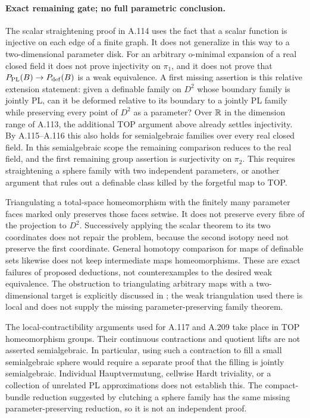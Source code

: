 \paragraph{Exact remaining gate; no full parametric conclusion.}
The scalar straightening proof in A.114 uses the fact that a scalar function is injective on
each edge of a finite graph. It does not generalize in this way
to a two-dimensional parameter disk. For an arbitrary o-minimal
expansion of a real closed field it does not prove injectivity on $\pi_1$, and it does not prove that
$P_{\rm PL}(B)\to P_{\rm def}(B)$ is a weak equivalence.
A first missing assertion is this relative extension statement:
given a definable family on $D^2$ whose boundary family is jointly
PL, can it be deformed relative to its boundary to a jointly PL
family while preserving every point of $D^2$ as a parameter?
Over $\mathbb R$ in the dimension range of A.113, the additional TOP
argument above already settles injectivity. By A.115--A.116 this
also holds for semialgebraic families over every real closed field.
In this semialgebraic scope the remaining comparison reduces to
the real field, and the first remaining group assertion is
surjectivity on $\pi_2$. This requires
straightening a sphere family with two independent parameters,
or another argument that rules out a definable class killed by
the forgetful map to TOP.

Triangulating a total-space homeomorphism with the finitely many
parameter faces marked only preserves those faces setwise. It
does not preserve every fibre of the projection to $D^2$.
Successively applying the scalar theorem to its two coordinates
does not repair the problem, because the second isotopy need not
preserve the first coordinate. General homotopy comparison for
maps of definable sets likewise does not keep intermediate maps
homeomorphisms. These are exact failures of proposed deductions,
not counterexamples to the desired weak equivalence. The obstruction
to triangulating arbitrary maps with a two-dimensional target is
explicitly discussed in \cite[p.~1231]{FichouShiota2017}; the weak
triangulation used there is local and does not supply the missing
parameter-preserving family theorem.

The local-contractibility arguments used for A.117 and A.209 take
place in TOP homeomorphism groups. Their continuous contractions
and quotient lifts are not asserted semialgebraic. In particular,
using such a contraction to fill a small semialgebraic sphere would
require a separate proof that the filling is jointly semialgebraic.
Individual Hauptvermutung, cellwise Hardt triviality, or a collection
of unrelated PL approximations does not establish this. The
compact-bundle reduction suggested by clutching a sphere family
has the same missing parameter-preserving reduction, so it is not
an independent proof.

